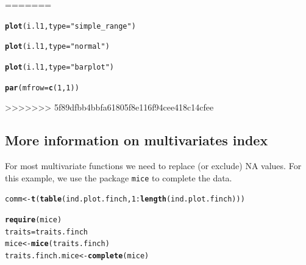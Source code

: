 \documentclass[12pt]{article}\usepackage[]{graphicx}\usepackage[]{color}
\makeatletter
\newcommand{\hlnum}[1]{\textcolor[rgb]{0.686,0.059,0.569}{#1}}%
\newcommand{\hlstr}[1]{\textcolor[rgb]{0.192,0.494,0.8}{#1}}%
\newcommand{\hlopt}[1]{\textcolor[rgb]{0,0,0}{#1}}%
\newcommand{\hlstd}[1]{\textcolor[rgb]{0.345,0.345,0.345}{#1}}%
\newcommand{\hlkwb}[1]{\textcolor[rgb]{0.69,0.353,0.396}{#1}}%
\newcommand{\hlkwc}[1]{\textcolor[rgb]{0.333,0.667,0.333}{#1}}%
\newcommand{\hlkwd}[1]{\textcolor[rgb]{0.737,0.353,0.396}{\textbf{#1}}}%
\newenvironment{kframe}{%
 \def\at@end@of@kframe{}%
 \ifinner\ifhmode%
  \def\at@end@of@kframe{\end{minipage}}%
  \begin{minipage}{\columnwidth}%
 \fi\fi%
 \def\FrameCommand##1{\hskip\@totalleftmargin \hskip-\fboxsep
 \colorbox{shadecolor}{##1}\hskip-\fboxsep
     \hskip-\linewidth \hskip-\@totalleftmargin \hskip\columnwidth}%
 \MakeFramed {\advance\hsize-\width
   \@totalleftmargin\z@ \linewidth\hsize
   \@setminipage}}%
 {\par\unskip\endMakeFramed%
 \at@end@of@kframe}
\newenvironment{knitrout}{}{} %
\makeatother
\begin{document}
\begin{knitrout}
=======


{\ttfamily\noindent\bfseries\color{errorcolor}{\#\# Error: objet 'i.l1' introuvable}}\begin{alltt}
\hlkwd{plot}\hlstd{(i.l1,}\hlkwc{type} \hlstd{=} \hlstr{"simple_range"}\hlstd{)}
\end{alltt}


{\ttfamily\noindent\bfseries\color{errorcolor}{\#\# Error: objet 'i.l1' introuvable}}\begin{alltt}
\hlkwd{plot}\hlstd{(i.l1,}\hlkwc{type} \hlstd{=} \hlstr{"normal"}\hlstd{)}
\end{alltt}


{\ttfamily\noindent\bfseries\color{errorcolor}{\#\# Error: objet 'i.l1' introuvable}}\begin{alltt}
\hlkwd{plot}\hlstd{(i.l1,}\hlkwc{type} \hlstd{=} \hlstr{"barplot"}\hlstd{)}
\end{alltt}


{\ttfamily\noindent\bfseries\color{errorcolor}{\#\# Error: objet 'i.l1' introuvable}}\begin{alltt}
\hlkwd{par}\hlstd{(}\hlkwc{mfrow} \hlstd{=} \hlkwd{c}\hlstd{(}\hlnum{1}\hlstd{,}\hlnum{1}\hlstd{))}
\end{alltt}
\end{kframe}
>>>>>>> 5f89dfbb4bbfa61805f8e116f94cee418c14cfee
\end{knitrout}



\newpage

\subsection{More information on multivariates index}

For most multivariate functions we need to replace (or exclude) NA values. For this example, we use the package \texttt{mice} to complete the data.

\begin{knitrout}
\color{fgcolor}\begin{kframe}
\begin{alltt}
\hlstd{comm}\hlkwb{<-}\hlkwd{t}\hlstd{(}\hlkwd{table}\hlstd{(ind.plot.finch,}\hlnum{1}\hlopt{:}\hlkwd{length}\hlstd{(ind.plot.finch)))}

\hlkwd{require}\hlstd{(mice)}
\hlstd{traits} \hlkwb{=} \hlstd{traits.finch}
\hlstd{mice}\hlkwb{<-}\hlkwd{mice}\hlstd{(traits.finch)}
\hlstd{traits.finch.mice}\hlkwb{<-}\hlkwd{complete}\hlstd{(mice)}
\end{alltt}
\end{kframe}
\end{knitrout}
\end{document}
